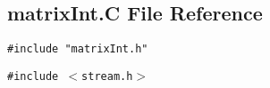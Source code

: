 \subsection{matrix\-Int.C File Reference}
\label{matrixInt.C}
{\tt \#include "matrix\-Int.h"}\par
{\tt \#include $<$stream.h$>$}\par
